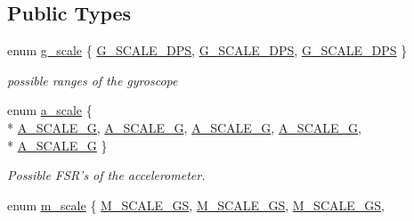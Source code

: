 \subsection*{Public Types}
\begin{DoxyCompactItemize}
\item 
enum \hyperlink{classedimu__system_ac676a08f02fdc00d8e8210985f03e692}{g\-\_\-scale} \{ \hyperlink{classedimu__system_ac676a08f02fdc00d8e8210985f03e692ae3ca8f1426d51135044acb876bbf8d62}{G\-\_\-\-S\-C\-A\-L\-E\-\_\-D\-P\-S}, 
\hyperlink{classedimu__system_ac676a08f02fdc00d8e8210985f03e692ac75709ac7d6a83a5c8fa75d61a550cdd}{G\-\_\-\-S\-C\-A\-L\-E\-\_\-D\-P\-S}, 
\hyperlink{classedimu__system_ac676a08f02fdc00d8e8210985f03e692aee32250020a13cdce09a11247d4dec46}{G\-\_\-\-S\-C\-A\-L\-E\-\_\-D\-P\-S}
 \}
\begin{DoxyCompactList}\small\item\em possible ranges of the gyroscope \end{DoxyCompactList}\item 
enum \hyperlink{classedimu__system_a61602a34b68df60f8f10c1cd7af37707}{a\-\_\-scale} \{ \\*
\hyperlink{classedimu__system_a61602a34b68df60f8f10c1cd7af37707aad79008dcf3400051f927a49d8ea079b}{A\-\_\-\-S\-C\-A\-L\-E\-\_\-G}, 
\hyperlink{classedimu__system_a61602a34b68df60f8f10c1cd7af37707a266db1462a0f522e112882219edde397}{A\-\_\-\-S\-C\-A\-L\-E\-\_\-G}, 
\hyperlink{classedimu__system_a61602a34b68df60f8f10c1cd7af37707a1b2236322d581b3b4ec808b5c754b95c}{A\-\_\-\-S\-C\-A\-L\-E\-\_\-G}, 
\hyperlink{classedimu__system_a61602a34b68df60f8f10c1cd7af37707a9db696dbf82ab98ea5645e1277a1cb50}{A\-\_\-\-S\-C\-A\-L\-E\-\_\-G}, 
\\*
\hyperlink{classedimu__system_a61602a34b68df60f8f10c1cd7af37707ac36f1eb434af93d54110b82882463ae0}{A\-\_\-\-S\-C\-A\-L\-E\-\_\-G}
 \}
\begin{DoxyCompactList}\small\item\em Possible F\-S\-R's of the accelerometer. \end{DoxyCompactList}\item 
enum \hyperlink{classedimu__system_ae7dbbcd66d0e16d693ac560884871da3}{m\-\_\-scale} \{ \hyperlink{classedimu__system_ae7dbbcd66d0e16d693ac560884871da3a1e2b05cb9c5203ecf8de8f02274aa875}{M\-\_\-\-S\-C\-A\-L\-E\-\_\-G\-S}, 
\hyperlink{classedimu__system_ae7dbbcd66d0e16d693ac560884871da3af5c9b84c56a16b30a438ce2cd0a80d60}{M\-\_\-\-S\-C\-A\-L\-E\-\_\-G\-S}, 
\hyperlink{classedimu__system_ae7dbbcd66d0e16d693ac560884871da3ad7d18ad9a5cc8188c90ead4a1b3c9dc5}{M\-\_\-\-S\-C\-A\-L\-E\-\_\-G\-S}, 

\end{DoxyCompactItemize}
